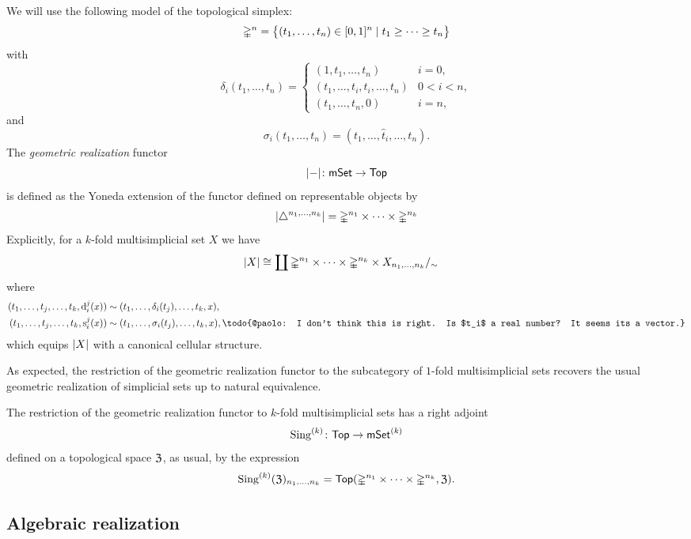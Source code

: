 We will use the following model of the topological simplex:
\[
\mathbb{\Delta}^n = \big\{
(t_1, \dots, t_n) \in [0,1]^n \mid t_1 \geq \dots \geq t_n
\big\}
\]
with
\[
\delta_i(t_1, \dots, t_n) =
\begin{cases}
	(1, t_1, \dots, t_n) & i = 0, \\
	(t_1, \dots, t_i, t_i, \dots, t_n) & 0 < i < n, \\
	(t_1, \dots, t_n, 0) & i = n,
\end{cases}
\]
and
\[
\sigma_i(t_1, \dots, t_n) = (t_1, \dots, \widehat t_i, \dots, t_n).
\]
The \textit{geometric realization} functor
\[
\lvert-\rvert \colon \mathsf{mSet} \to \mathsf{Top}
\]
is defined as the Yoneda extension of the functor defined on representable objects by
\[
\lvert\triangle^{n_1,\dots,n_k}\rvert =
\mathbb{\Delta}^{n_1}\times\dots\times\mathbb{\Delta}^{n_k}
\]
Explicitly, for a $k$-fold multisimplicial set $X$ we have
\begin{align*}
	\lvert X\rvert &\cong
	\coprod \mathbb{\Delta}^{n_1}\times\dots\times\mathbb{\Delta}^{n_k} \times X_{n_1,\dots,n_k} /_\sim
\end{align*}
where
\[
\begin{split}
	(t_1, \dots, t_j, \dots, t_k, \face^j_i(x)) &\sim (t_1, \dots, \delta_i(t_j), \dots, t_k, x), \\
	(t_1, \dots, t_j, \dots, t_k, \dege^j_i(x)) &\sim (t_1, \dots, \sigma_i(t_j), \dots, t_k, x), \todo{@paolo: I don't think this is right. Is $t_i$ a real number? It seems its a vector.}
\end{split}
\]
which equips $\lvert X\rvert$ with a canonical cellular structure.

As expected, the restriction of the geometric realization functor to the subcategory of $1$-fold multisimplicial sets recovers the usual geometric realization of simplicial sets up to natural equivalence.

The restriction of the geometric realization functor to $k$-fold multisimplicial sets has a right adjoint
\[
\operatorname{Sing}^{(k)} \colon \mathsf{Top} \to \mathsf{mSet}^{(k)}
\]
defined on a topological space $\mathfrak{Z}$, as usual, by the expression
\[
\operatorname{Sing}^{(k)}(\mathfrak{Z})_{n_1,\dots,n_k} = \mathsf{Top}(\mathbb{\Delta}^{n_1}\times\dots\times\mathbb{\Delta}^{n_k},\mathfrak{Z}).
\]


\subsection{Algebraic realization}

